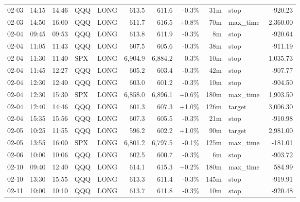 \documentclass[11pt,a4paper,twoside]{article}
\begin{document}
\begin{center}
\begin{longtable}{>{\color{txtmain}}l l l l l r r r r >{\color{txtmain}}l r}
02-03 & 14:15 & 14:46 & QQQ & LONG & 613.5 & 611.6 & \textcolor{lossred}{-0.3\%} & 31m & stop & \textcolor{lossred}{-920.23} \\
02-03 & 14:50 & 16:00 & QQQ & LONG & 611.7 & 616.5 & \textcolor{wingreen}{+0.8\%} & 70m & max\_time & \textcolor{wingreen}{2,360.00} \\
02-04 & 09:45 & 09:53 & QQQ & LONG & 613.8 & 611.9 & \textcolor{lossred}{-0.3\%} & 8m & stop & \textcolor{lossred}{-920.64} \\
02-04 & 11:05 & 11:43 & QQQ & LONG & 607.5 & 605.6 & \textcolor{lossred}{-0.3\%} & 38m & stop & \textcolor{lossred}{-911.19} \\
02-04 & 11:30 & 11:40 & SPX & LONG & 6,904.9 & 6,884.2 & \textcolor{lossred}{-0.3\%} & 10m & stop & \textcolor{lossred}{-1,035.73} \\
02-04 & 11:45 & 12:27 & QQQ & LONG & 605.2 & 603.4 & \textcolor{lossred}{-0.3\%} & 42m & stop & \textcolor{lossred}{-907.77} \\
02-04 & 12:30 & 12:40 & QQQ & LONG & 603.0 & 601.2 & \textcolor{lossred}{-0.3\%} & 10m & stop & \textcolor{lossred}{-904.50} \\
02-04 & 12:30 & 15:30 & SPX & LONG & 6,858.0 & 6,896.1 & \textcolor{wingreen}{+0.6\%} & 180m & max\_time & \textcolor{wingreen}{1,903.50} \\
02-04 & 12:40 & 14:46 & QQQ & LONG & 601.3 & 607.3 & \textcolor{wingreen}{+1.0\%} & 126m & target & \textcolor{wingreen}{3,006.30} \\
02-04 & 15:35 & 15:56 & QQQ & LONG & 607.3 & 605.5 & \textcolor{lossred}{-0.3\%} & 21m & stop & \textcolor{lossred}{-910.98} \\
02-05 & 10:25 & 11:55 & QQQ & LONG & 596.2 & 602.2 & \textcolor{wingreen}{+1.0\%} & 90m & target & \textcolor{wingreen}{2,981.00} \\
02-05 & 13:55 & 16:00 & SPX & LONG & 6,801.2 & 6,797.5 & \textcolor{lossred}{-0.1\%} & 125m & max\_time & \textcolor{lossred}{-181.01} \\
02-06 & 10:00 & 10:06 & QQQ & LONG & 602.5 & 600.7 & \textcolor{lossred}{-0.3\%} & 6m & stop & \textcolor{lossred}{-903.72} \\
02-10 & 09:40 & 12:40 & QQQ & LONG & 614.1 & 615.3 & \textcolor{wingreen}{+0.2\%} & 180m & max\_time & \textcolor{wingreen}{584.99} \\
02-10 & 13:30 & 15:55 & QQQ & LONG & 613.3 & 611.4 & \textcolor{lossred}{-0.3\%} & 145m & stop & \textcolor{lossred}{-919.91} \\
02-11 & 10:00 & 10:10 & QQQ & LONG & 613.7 & 611.8 & \textcolor{lossred}{-0.3\%} & 10m & stop & \textcolor{lossred}{-920.48} \\

\end{longtable}
\end{center}
\end{document}
